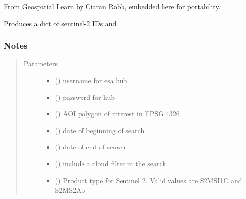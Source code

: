 \documentclass[letterpaper,10pt,english]{sphinxmanual}
\begin{document}
\begin{fulllineitems}
\label{\detokenize{index:pyeo.queries_and_downloads.sent2_query}}
From Geospatial Learn by Ciaran Robb, embedded here for portability.

Produces a dict of sentinel-2 IDs and
\subsubsection*{Notes}
\begin{quote}\begin{description}
\item[{Parameters}] \leavevmode\begin{itemize}
\item {} 
 () \textendash{} username for esa hub

\item {} 
 () \textendash{} password for hub

\item {} 
 () \textendash{} AOI polygon of interest in EPSG 4326

\item {} 
 () \textendash{} date of beginning of search

\item {} 
 () \textendash{} date of end of search

\item {} 
 (\sphinxstyleliteralemphasis{\sphinxupquote{ (}}\sphinxstyleliteralemphasis{\sphinxupquote{)}}) \textendash{} include a cloud filter in the search

\item {} 
 (\sphinxstyleliteralemphasis{\sphinxupquote{ (}}\sphinxstyleliteralemphasis{\sphinxupquote{)}}) \textendash{} Product type for Sentinel 2. Valid values are S2MSI1C and S2MS2Ap

\end{itemize}

\end{description}\end{quote}

\end{fulllineitems}
\end{document}
